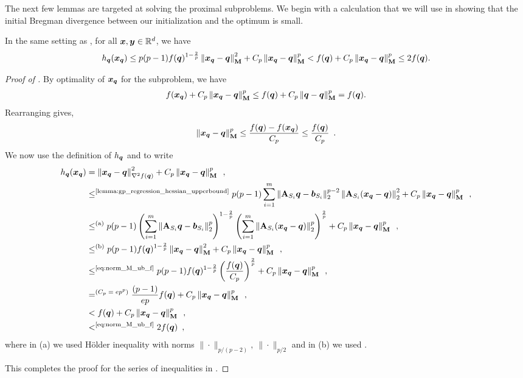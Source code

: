 The next few lemmas are targeted at solving the proximal subproblems. We begin with a calculation that we will use in showing that the initial Bregman divergence between our initialization and the optimum is small.

\begin{lemma}
\label{lemma:initial_bregman_div}
In the same setting as , for all $\bm{x},\bm{y} \in \mathbb{R}^d$, we have
\begin{align*}
    h_{\bm{q}}(\bm{x}_{\bm{q}}) \le p(p-1)f(\bm{q})^{1-\frac{2}{p}}\left\lVert \bm{x}_{\bm{q}}-\bm{q} \right\rVert_{\mathbf{M}}^2 + C_p\left\lVert \bm{x}_{\bm{q}}-\bm{q} \right\rVert_{\mathbf{M}}^p < f(\bm{q})+C_p\left\lVert \bm{x}_{\bm{q}}-\bm{q} \right\rVert_{\mathbf{M}}^p \le 2f(\bm{q}).
\end{align*}
\end{lemma}
\begin{proof}[Proof of ]
By optimality of $\bm{x}_{\bm{q}}$ for the subproblem, we have
\begin{align*}
    f(\bm{x}_{\bm{q}})+C_p\left\lVert \bm{x}_{\bm{q}}-\bm{q} \right\rVert_{\mathbf{M}}^p \le f(\bm{q})+C_p\left\lVert \bm{q}-\bm{q} \right\rVert_{\mathbf{M}}^p=f(\bm{q}).
\end{align*}
Rearranging gives,
\begin{align}
    \left\lVert \bm{x}_{\bm{q}}-\bm{q} \right\rVert_{\mathbf{M}}^p \le \frac{f(\bm{q})-f(\bm{x}_{\bm{q}})}{C_p} \le \frac{f(\bm{q})}{C_p}\enspace.\label{eq:norm_M_ub_f}
\end{align}
We now use the definition of $h_{\bm{q}}$ and  to write
\begin{align*}
    h_{\vq}(\vx_{\vq}) &= \norm{\vx_{\vq}-\vq}_{\nabla^2 f(\vq)}^2 + C_p\norm{\vx_{\vq}-\vq}_{\mM}^p\enspace,\\
    &\le^{\text{\Cref{lemma:gp_regression_hessian_upperbound}}} p(p-1)\sum_{i=1}^m \norm{\mA_{S_i}\vq-\vb_{S_i}}_2^{p-2}\norm{\mA_{S_i}(\vx_{\vq}-\vq)}_2^2 + C_p\norm{\vx_{\vq}-\vq}_{\mM}^p\enspace,\\
    &\le^{\text{(a)}} p(p-1)\inparen{\sum_{i=1}^m \norm{\mA_{S_i}\vq-\vb_{S_i}}_2^p}^{1-\frac{2}{p}}\inparen{\sum_{i=1}^m \norm{\mA_{S_i}(\vx_{\vq}-\vq)}_2^p}^{\frac{2}{p}}+ C_p\norm{\vx_{\vq}-\vq}_{\mM}^p\enspace,\\
    &\le^{\text{(b)}} p(p-1)f(\vq)^{1-\frac{2}{p}}\norm{\vx_{\vq}-\vq}_{\mM}^{2} + C_p\norm{\vx_{\vq}-\vq}_{\mM}^p\enspace,\\
    &\le^{\text{\eqref{eq:norm_M_ub_f}}} p(p-1)f(\vq)^{1-\frac{2}{p}}\inparen{\frac{f(\vq)}{C_p}}^{\frac{2}{p}} + C_p\norm{\vx_{\vq}-\vq}_{\mM}^p\enspace,\\
    &=^{\text{($C_p = ep^p$)}} \frac{(p-1)}{ep}f(\vq)+ C_p\norm{\vx_{\vq}-\vq}_{\mM}^p\enspace,\\
    &< f(\vq) + C_p\norm{\vx_{\vq}-\vq}_{\mM}^p\enspace,\\
    &<^{\text{\eqref{eq:norm_M_ub_f}}} 2f(\vq)\enspace,
\end{align*}
where in (a) we used H\"older inequality with norms $\|\cdot\|_{p/(p-2)},\ \|\cdot\|_{p/2}$ and in (b) we used  . 

This completes the proof for the series of inequalities in .
\end{proof}
